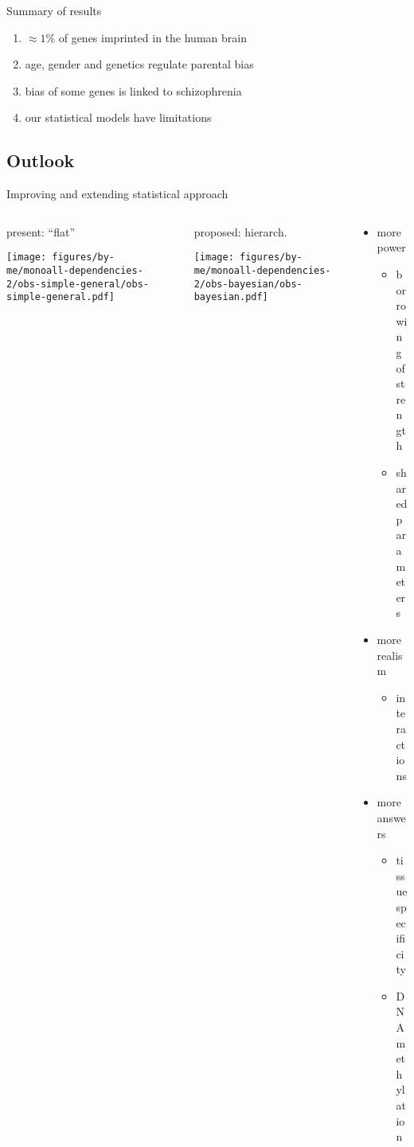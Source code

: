 \documentclass{beamer}
\newcommand{\platefigscale}[0]{0.7}
\begin{document}
\begin{frame}{Summary of results}
\begin{enumerate}
\item \(\approx 1\%\) of genes imprinted in the human brain
\item age, gender and genetics regulate parental bias 
\item bias of some genes is linked to schizophrenia 
\item our statistical models have limitations
\end{enumerate}
\end{frame}


\subsection{Outlook}


\begin{frame}{Improving and extending statistical approach}
\begin{columns}[t]
\begin{column}{0.3\textwidth}
present: ``flat''

\texttt{[image: figures/by-me/monoall-dependencies-2/obs-simple-general/obs-simple-general.pdf]}
\end{column}
\begin{column}{0.3\textwidth}
proposed: hierarch.

\texttt{[image: figures/by-me/monoall-dependencies-2/obs-bayesian/obs-bayesian.pdf]}
\end{column}
\begin{column}{0.6\textwidth}
\begin{itemize}
\item more power
\begin{itemize}
\item borrowing of strength
\item shared parameters
\end{itemize}
\item<2-> more realism
\begin{itemize}
\item interactions
\end{itemize} 
\item<3-> more answers
\begin{itemize}
\item tissue specificity
\item DNA methylation
\end{itemize} 
\end{itemize}
\end{column}
\end{columns}

\end{frame}



\end{document}
